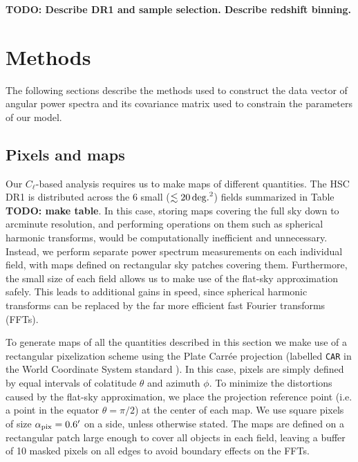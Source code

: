 \documentclass[a4paper,11pt]{article}
\newcommand{\todo}[1]{{\bf TODO: #1}}
\begin{document}
  \todo{Describe DR1 and sample selection. Describe redshift binning.}

\section{Methods}\label{sec:methods}
  The following sections describe the methods used to construct the data vector of angular power spectra and its covariance matrix used to constrain the parameters of our model.
  
  \subsection{Pixels and maps}\label{ssec:methods.pix}
    Our $C_\ell$-based analysis requires us to make maps of different quantities. The HSC DR1 is distributed across the 6 small ($\lesssim20\,{\rm deg.}^2$) fields summarized in Table \todo{make table}. In this case, storing maps covering the full sky down to arcminute resolution, and performing operations on them such as spherical harmonic transforms, would be computationally inefficient and unnecessary. Instead, we perform separate power spectrum measurements on each individual field, with maps defined on rectangular sky patches covering them. Furthermore, the small size of each field allows us to make use of the flat-sky approximation safely. This leads to additional gains in speed, since spherical harmonic transforms can be replaced by the far more efficient fast Fourier transforms (FFTs).
    
    To generate maps of all the quantities described in this section we make use of a rectangular pixelization scheme using the Plate Carr\'ee projection (labelled {\tt CAR} in the World Coordinate System standard \cite{2002A&A...395.1077C}). In this case, pixels are simply defined by equal intervals of colatitude $\theta$ and azimuth $\phi$. To minimize the distortions caused by the flat-sky approximation, we place the projection reference point (i.e. a point in the equator $\theta=\pi/2$) at the center of each map. We use square pixels of size $\alpha_{\rm pix}=0.6'$ on a side, unless otherwise stated. The maps are defined on a rectangular patch large enough to cover all objects in each field, leaving a buffer of 10 masked pixels on all edges to avoid boundary effects on the FFTs.
  
\end{document}
